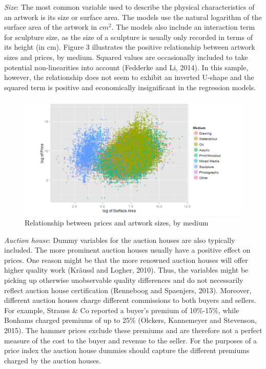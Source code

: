 \documentclass[12pt,]{article}
\begin{document}
\emph{Size}: The most common variable used to describe the physical
characteristics of an artwork is its size or surface area. The models
use the natural logarithm of the surface area of the artwork in
\(cm^2\). The models also include an interaction term for sculpture
size, as the size of a sculpture is usually only recorded in terms of
its height (in cm). Figure 3 illustrates the positive relationship
between artwork sizes and prices, by medium. Squared values are
occasionally included to take potential non-linearities into account
(Fedderke and Li, 2014). In this sample, however, the relationship does
not seem to exhibit an inverted U-shape and the squared term is positive
and economically insignificant in the regression models.

\begin{figure}[htbp]
\centering
\includegraphics{Art_Price_Indices_3_files/figure-latex/figure3-1.pdf}
\caption{Relationship between prices and artwork sizes, by medium}
\end{figure}

\emph{Auction house}: Dummy variables for the auction houses are also
typically included. The more prominent auction houses usually have a
positive effect on prices. One reason might be that the more renowned
auction houses will offer higher quality work (Kräussl and Logher,
2010). Thus, the variables might be picking up otherwise unobservable
quality differences and do not necessarily reflect auction house
certification (Renneboog and Spaenjers, 2013). Moreover, different
auction houses charge different commissions to both buyers and sellers.
For example, Strauss \& Co reported a buyer's premium of 10\%-15\%,
while Bonhams charged premiums of up to 25\% (Olckers, Kannemeyer and
Stevenson, 2015). The hammer prices exclude these premiums and are
therefore not a perfect measure of the cost to the buyer and revenue to
the seller. For the purposes of a price index the auction house dummies
should capture the different premiums charged by the auction houses.
\end{document}
